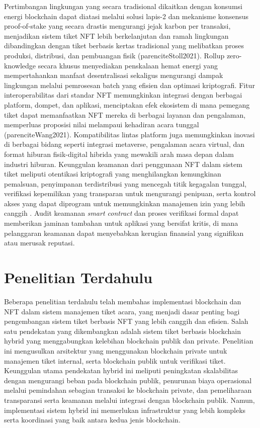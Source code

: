 Pertimbangan lingkungan yang secara tradisional dikaitkan dengan konsumsi energi blockchain dapat diatasi melalui solusi lapis-2 dan mekanisme konsensus proof-of-stake yang secara drastis mengurangi jejak karbon per transaksi, menjadikan sistem tiket NFT lebih berkelanjutan dan ramah lingkungan dibandingkan dengan tiket berbasis kertas tradisional yang melibatkan proses produksi, distribusi, dan pembuangan fisik (parencite{Stoll2021}). Rollup zero-knowledge secara khusus menyediakan penskalaan hemat energi yang mempertahankan manfaat desentralisasi sekaligus mengurangi dampak lingkungan melalui pemrosesan batch yang efisien dan optimasi kriptografi.
Fitur interoperabilitas dari standar NFT memungkinkan integrasi dengan berbagai platform, dompet, dan aplikasi, menciptakan efek ekosistem di mana pemegang tiket dapat memanfaatkan NFT mereka di berbagai layanan dan pengalaman, memperluas proposisi nilai melampaui kehadiran acara tunggal (parencite{Wang2021}). Kompatibilitas lintas platform juga memungkinkan inovasi di berbagai bidang seperti integrasi metaverse, pengalaman acara virtual, dan format hiburan fisik-digital hibrida yang mewakili arah masa depan dalam industri hiburan. Keunggulan keamanan dari penggunaan NFT dalam sistem tiket meliputi otentikasi kriptografi yang menghilangkan kemungkinan pemalsuan, penyimpanan terdistribusi yang mencegah titik kegagalan tunggal, verifikasi kepemilikan yang transparan untuk mengurangi penipuan, serta kontrol akses yang dapat diprogram untuk memungkinkan manajemen izin yang lebih canggih \parencite{Wilson2022}. Audit keamanan \emph{smart contract} dan proses verifikasi formal dapat memberikan jaminan tambahan untuk aplikasi yang bersifat kritis, di mana pelanggaran keamanan dapat menyebabkan kerugian finansial yang signifikan atau merusak reputasi.
\section{ Penelitian Terdahulu}
\label{sec:penelitianterdahulu}

Beberapa penelitian terdahulu telah membahas implementasi blockchain dan NFT
dalam sistem manajemen tiket acara, yang menjadi dasar penting bagi
pengembangan sistem tiket berbasis NFT yang lebih canggih dan efisien. Salah
satu pendekatan yang dikembangkan adalah sistem tiket berbasis blockchain
hybrid yang menggabungkan kelebihan blockchain publik dan private. Penelitian
ini mengusulkan arsitektur yang menggunakan blockchain private untuk manajemen
tiket internal, serta blockchain publik untuk verifikasi tiket. Keunggulan
utama pendekatan hybrid ini meliputi peningkatan skalabilitas dengan mengurangi
beban pada blockchain publik, penurunan biaya operasional melalui pemindahan
sebagian transaksi ke blockchain private, dan pemeliharaan transparansi serta
keamanan melalui integrasi dengan blockchain publik. Namun, implementasi sistem
hybrid ini memerlukan infrastruktur yang lebih kompleks serta koordinasi yang
baik antara kedua jenis blockchain.

